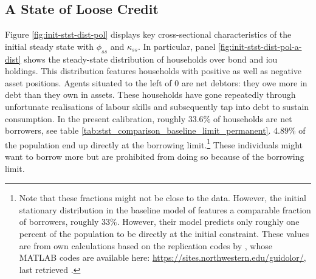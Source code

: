 \documentclass[12pt]{article} %
\numberwithin{equation}{section} %
\numberwithin{figure}{section}
\numberwithin{table}{section}
\begin{document}
\subsection{A State of Loose Credit}
\label{sec:limit-stst-loose}


Figure \ref{fig:init-stst-dist-pol} displays key cross-sectional characteristics of the initial steady state with $\phi_{ss}$ and $\kappa_{ss}$. In particular, panel \ref{fig:init-stst-dist-pol-a-dist} shows the steady-state distribution of households over bond and \Gls{iou} holdings. This distribution features households with positive as well as negative asset positions. Agents situated to the left of $0$ are net debtors: they owe more in debt than they own in assets. These households have gone repeatedly through unfortunate realisations of labour skills and subsequently tap into debt to sustain consumption. In the present calibration, roughly $33.6\%$ of households are net borrowers, see table \ref{tab:stst_comparison_baseline_limit_permanent}. $4.89\%$ of the population end up directly at the borrowing limit.\footnote{Note that these fractions might not be close to the data. However, the initial stationary distribution in the baseline model of \textcite{gl2017} features a comparable fraction of borrowers, roughly $33\%$. However, their model predicts only roughly one percent of the population to be directly at the initial constraint. These values are from own calculations based on the replication codes by \textcite{gl2017}, whose MATLAB codes are available here: \url{https://sites.northwestern.edu/guidolor/}, last retrieved .} These individuals might want to borrow more but are prohibited from doing so because of the borrowing limit.
\end{document}
